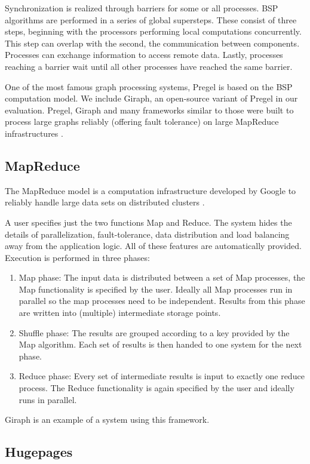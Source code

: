 Synchronization is realized through barriers for some or all processes.
BSP algorithms are performed in a series of global supersteps. These consist of three steps, beginning with the processors performing local computations concurrently.
This step can overlap with the second, the communication between components. Processes can exchange information to access remote data.
Lastly, processes reaching a barrier wait until all other processes have reached the same barrier.

One of the most famous graph processing systems, Pregel \cite{pregel} is based on the BSP computation model. We include Giraph, an open-source variant of Pregel in our evaluation.
Pregel, Giraph and many frameworks similar to those were built to process large graphs reliably (offering fault tolerance) on large MapReduce infrastructures \cite{Giraph,graphx,powergraph}.

\subsection{MapReduce}
The MapReduce model is a computation infrastructure developed by Google to reliably handle large data sets on distributed clusters \cite{mapreduce}.

A user specifies just the two functions Map and Reduce.
The system hides the details of parallelization, fault-tolerance, data distribution and load balancing away from the application logic.
All of these features are automatically provided.
Execution is performed in three phases:
\begin{enumerate}
	\item Map phase: The input data is distributed between a set of Map processes, the Map functionality is specified by the user. Ideally all Map processes run in parallel so the map processes need to be independent. Results from this phase are written into (multiple) intermediate storage points.
	\item Shuffle phase: The results are grouped according to a key provided by the Map algorithm. Each set of results is then handed to one system for the next phase.
	\item Reduce phase: Every set of intermediate results is input to exactly one reduce process. The Reduce functionality is again specified by the user and ideally runs in parallel.
\end{enumerate}
Giraph \cite{Giraph} is an example of a system using this framework.

\subsection{Hugepages}
\cite{hugepages}
